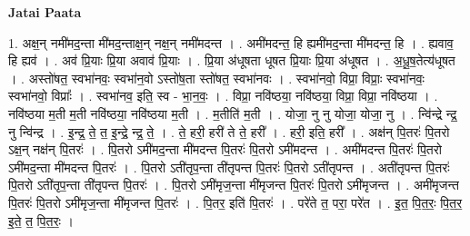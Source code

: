 \documentclass[17pt]{extarticle}
\begin{document}
\textbf{Jatai Paata} \newline

1. अक्ष॒न् नमी॑मद॒न्ता मी॑मद॒न्ताक्ष॒न् नक्ष॒न् नमी॑मदन्त । . अमी॑मदन्त॒ हि ह्यमी॑मद॒न्ता मी॑मदन्त॒ हि । . ह्यवाव॒ हि ह्यव॑ । . अव॑ प्रि॒याः प्रि॒या अवाव॑ प्रि॒याः । . प्रि॒या अ॑धूषता धूषत प्रि॒याः प्रि॒या अ॑धूषत । . अ॒धू॒ष॒तेत्य॑धूषत । . अस्तो॑षत॒ स्वभा॑नवः॒ स्वभा॑न॒वो ऽस्तो॑ष॒ता स्तो॑षत॒ स्वभा॑नवः । . स्वभा॑नवो॒ विप्रा॒ विप्राः॒ स्वभा॑नवः॒ स्वभा॑नवो॒ विप्राः᳚ । . स्वभा॑नव॒ इति॒ स्व - भा॒न॒वः॒ । . विप्रा॒ नवि॑ष्ठया॒ नवि॑ष्ठया॒ विप्रा॒ विप्रा॒ नवि॑ष्ठया । . नवि॑ष्ठया म॒ती म॒ती नवि॑ष्ठया॒ नवि॑ष्ठया म॒ती । . म॒तीति॑ म॒ती । . योजा॒ नु नु योजा॒ योजा॒ नु । . न्वि॑न्द्रे न्द्र॒ नु न्वि॑न्द्र । . इ॒न्द्र॒ ते॒ त॒ इ॒न्द्रे॒ न्द्र॒ ते॒ । . ते॒ हरी॒ हरी॑ ते ते॒ हरी᳚ । . हरी॒ इति॒ हरी᳚ । . अक्ष॑न् पि॒तरः॑ पि॒तरो ऽक्ष॒न् नक्ष॑न् पि॒तरः॑ । . पि॒तरो ऽमी॑मद॒न्ता मी॑मदन्त पि॒तरः॑ पि॒तरो ऽमी॑मदन्त । . अमी॑मदन्त पि॒तरः॑ पि॒तरो ऽमी॑मद॒न्ता मी॑मदन्त पि॒तरः॑ । . पि॒तरो ऽती॑तृप॒न्ता ती॑तृपन्त पि॒तरः॑ पि॒तरो ऽती॑तृपन्त । . अती॑तृपन्त पि॒तरः॑ पि॒तरो ऽती॑तृप॒न्ता ती॑तृपन्त पि॒तरः॑ । . पि॒तरो ऽमी॑मृज॒न्ता मी॑मृजन्त पि॒तरः॑ पि॒तरो ऽमी॑मृजन्त । . अमी॑मृजन्त पि॒तरः॑ पि॒तरो ऽमी॑मृज॒न्ता मी॑मृजन्त पि॒तरः॑ । . पि॒तर॒ इति॑ पि॒तरः॑ । . परे॑ते त॒ परा॒ परे॑त । . इ॒त॒ पि॒त॒रः॒ पि॒त॒र॒ इ॒ते॒ त॒ पि॒त॒रः॒ । \newline
\end{document}
